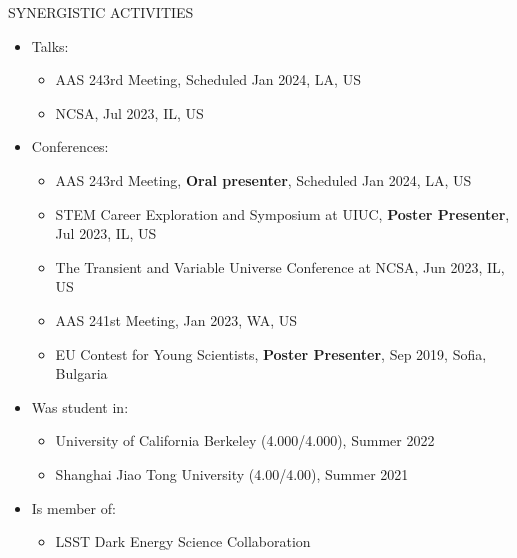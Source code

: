 \documentclass[10pt]{article} %
\begin{document}
\begin{section}{SYNERGISTIC ACTIVITIES}
    
\begin{itemize}[leftmargin=1.5em]
    \item Talks: 
    \begin{itemize}[leftmargin=1.5em]
        \item AAS 243rd Meeting, Scheduled Jan 2024, LA, US
        \item NCSA, Jul 2023, IL, US
    \end{itemize}
    \item Conferences: 
    \begin{itemize}[leftmargin=1.5em]
        \item AAS 243rd Meeting, \textbf{Oral presenter}, Scheduled Jan 2024, LA, US
        \item STEM Career Exploration and Symposium at UIUC, \textbf{Poster Presenter}, Jul 2023, IL, US
        \item The Transient and Variable Universe Conference at NCSA, Jun 2023, IL, US
        \item AAS 241st Meeting, Jan 2023, WA, US
        \item EU Contest for Young Scientists, \textbf{Poster Presenter}, Sep 2019, Sofia, Bulgaria
    \end{itemize}
    \item Was student in: 
    \begin{itemize}[leftmargin=1.5em]
        \item University of California Berkeley (4.000/4.000), Summer 2022
        \item Shanghai Jiao Tong University (4.00/4.00), Summer 2021
    \end{itemize}
    \item Is member of: 
    \begin{itemize}[leftmargin=1.5em]
        \item LSST Dark Energy Science Collaboration
    \end{itemize}
\end{itemize}

\end{section}
\end{document}
